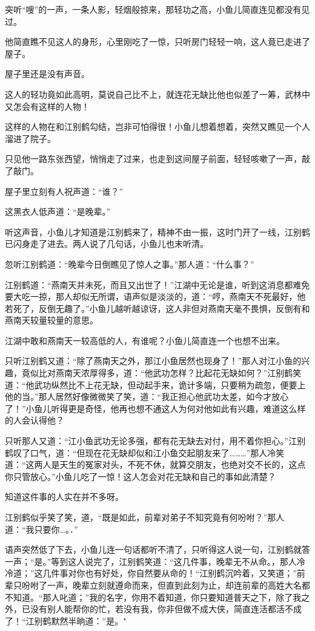 \documentclass[12pt,oneside]{book}
\begin{document}
突听``嗖''的一声，一条人影，轻烟般掠来，那轻功之高，小鱼儿简直连见都没有见过。

他简直瞧不见这人的身形，心里刚吃了一惊，只听房门轻轻一响，这人竟已走进了屋子。

屋子里还是没有声音。

这人的轻功竟如此高明，莫说自己比不上，就连花无缺比他也似差了一筹，武林中又怎会有这样的人物！

这样的人物在和江别鹤勾结，岂非可怕得很！小鱼儿想着想着，突然又瞧见一个人溜进了院子。

只见他一路东张西望，悄悄走了过来，也走到这间屋子前面，轻轻咳嗽了一声，敲了敲门。

屋子里立刻有人祝声道：``谁？''

这黑衣人低声道：``是晚辈。''

听这声音，小鱼儿才知道是江别鹤来了，精神不由一振，这时门开了一线，江别鹤已闪身走了进去。两人说了几句话，小鱼儿也末听清。

忽听江别鹤道：``晚辈今日倒瞧见了惊人之事。''那人道：``什么事？''

江别鹤道：``燕南天并未死，而且又出世了！''江湖中无论是谁，听到这消息都难免要大吃一掠，那人却似无所谓，语声似是淡淡的，道：``哼，燕南天不死最好，他若死了，反倒无趣了。''小鱼儿越听越谅讶，这人非但对燕南天毫不畏惧，反倒有和燕南天较量较量的意思。

江湖中敢和燕南天一较高低的人，有谁呢？小鱼儿简直连一个也想不出来。

只听江别鹤又道：``除了燕南天之外，那江小鱼居然也现身了！''那人对江小鱼的兴趣，竟似比对燕南天浓厚得多，道：``他武功怎样？比起花无缺如何？''江别鹤笑道：``他武功纵然比不上花无缺，但动起手来，诡计多端，只要稍为疏忽，便要上他的当。''那人居然好像微微笑了笑，道：``我正担心他武功太差，如今才放心了！''小鱼儿听得更是奇怪，他再也想不通这人为何对他如此有兴趣，难道这么样的人会认得他？

只听那人又道：``江小鱼武功无论多强，都有花无缺去对付，用不着你担心。''江别鹤叹了口气，道：``但现在花无缺却似和江小鱼交起朋友来了\ldots\ldots\ldots{}''那人冷笑道：``这两人是天生的冤家对头，不死不休，就算交朋友，也绝对交不长的，这点你只管放心。''小鱼儿吃了一惊！这人怎会对花无缺和自己的事如此清楚？

知道这件事的人实在并不多呀。

江别鹤似乎笑了笑，道，``既是如此，前辈对弟子不知究竟有何吩咐？''那人道：``我只要你\ldots。．''

语声突然低了下去，小鱼儿连一句话都听不清了，只听得这人说一句，江别鹤就答一声；``是。''等到这人说完了，江别鹤笑道：``这几件事，晚辈无不从命。，那人冷冷道；''这几件事对你也有好处，你自然要从命的！``江别鹤沉吟着，又笑道；''前辈只吩咐了一声，晚辈立刻就遵命而来，但直到此刻为止，却连前辈的高姓大名都不知道。``那人叱道；''我的名字，你用不着知道，你只要知道普天之下，除了我之外，已没有别人能帮你的忙，若没有我，你非但做不成大侠，简直连活都活不成了！``江别鹤默然半晌道：''是。"
\end{document}
